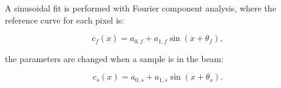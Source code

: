 A sinusoidal fit is performed with Fourier component analysis, where the
reference curve for each pixel is:

\begin{equation}
    c_f(x) = a_{0,f} + a_{1,f} \sin(x + \theta_{f}),
    \label{eqn:flat}
\end{equation}

the parameters are changed when a sample is in the beam:

\begin{equation}
    c_s(x) = a_{0,s} + a_{1,s} \sin(x + \theta_{s}).
    \label{eqn:sample}
\end{equation}